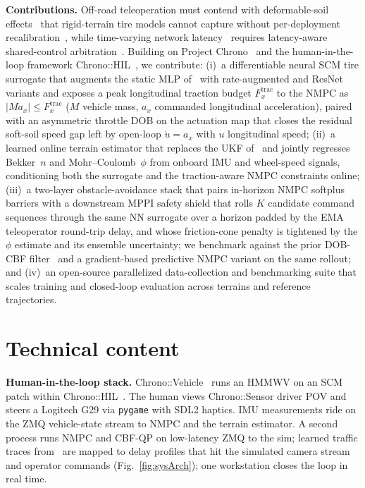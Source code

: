 \documentclass{acmd2026_abstract}
\begin{document}
\vspace{2pt}
\noindent\textbf{Contributions.}  Off-road
teleoperation must contend with deformable-soil effects~\cite{Bekker69}
that rigid-terrain tire models cannot capture without per-deployment
recalibration~\cite{Dallas21}, while time-varying network
latency~\cite{Choi23} requires latency-aware shared-control
arbitration~\cite{Zhang25}.  Building on Project Chrono~\cite{Tasora16} and
the human-in-the-loop framework Chrono::HIL~\cite{Zhou23}, we contribute: (i)~a differentiable
neural SCM tire surrogate that augments the static MLP
of~\cite{Dallas21} with rate-augmented and ResNet variants and
exposes a peak longitudinal traction budget $F_x^{\mathrm{trac}}$
to the NMPC as $|M a_x|\!\le\!F_x^{\mathrm{trac}}$ ($M$ vehicle
mass, $a_x$ commanded longitudinal acceleration), paired with an
asymmetric throttle DOB on the actuation map that closes the
residual soft-soil speed gap left by open-loop $\dot u\!=\!a_x$
with $u$ longitudinal speed;
(ii)~a learned online terrain estimator that
replaces the UKF of~\cite{Dallas21} and jointly regresses
Bekker~$n$ and Mohr--Coulomb~$\phi$ from onboard IMU and
wheel-speed signals, conditioning both the surrogate and the
traction-aware NMPC constraints online; (iii)~a two-layer obstacle-avoidance
stack that pairs in-horizon NMPC softplus barriers with a
downstream MPPI safety shield that rolls $K$ candidate command
sequences through the same NN surrogate over a horizon padded by
the EMA teleoperator round-trip delay, and whose friction-cone
penalty is tightened by the $\phi$ estimate and its ensemble
uncertainty; we benchmark against the prior DOB-CBF
filter~\cite{Zhang25} and a gradient-based predictive NMPC variant
on the same rollout; and (iv)~an open-source parallelized
data-collection and benchmarking suite that scales training and
closed-loop evaluation across terrains and reference trajectories.

\section*{Technical content}
\vspace{-4pt}

\noindent\textbf{Human-in-the-loop stack.}  Chrono::Vehicle~\cite{Serban19}
runs an HMMWV on an SCM patch within Chrono::HIL~\cite{Zhou23}.
The human views Chrono::Sensor driver POV and steers a Logitech G29
via \texttt{pygame} with SDL2 haptics.  IMU measurements ride on the
ZMQ vehicle-state stream to NMPC and the terrain estimator.  A second
process runs NMPC and CBF-QP on low-latency ZMQ to the sim; learned
traffic traces from~\cite{Choi23} are mapped to delay profiles that
hit the simulated camera stream and operator commands
(Fig.~\ref{fig:sysArch}); one workstation closes the loop in real
time.
\end{document}
